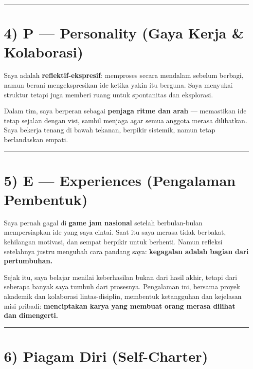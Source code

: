 \documentclass[
  letterpaper,
  DIV=11,
  numbers=noendperiod]{scrreprt}
\begin{document}
\begin{center}\rule{0.5\linewidth}{0.5pt}\end{center}

\section{4) P --- Personality (Gaya Kerja \&
Kolaborasi)}\label{p-personality-gaya-kerja-kolaborasi}

Saya adalah \textbf{reflektif-ekspresif}: memproses secara mendalam
sebelum berbagi, namun berani mengekspresikan ide ketika yakin itu
berguna. Saya menyukai struktur tetapi juga memberi ruang untuk
spontanitas dan eksplorasi.

Dalam tim, saya berperan sebagai \textbf{penjaga ritme dan arah} ---
memastikan ide tetap sejalan dengan visi, sambil menjaga agar semua
anggota merasa dilibatkan. Saya bekerja tenang di bawah tekanan,
berpikir sistemik, namun tetap berlandaskan empati.

\begin{center}\rule{0.5\linewidth}{0.5pt}\end{center}

\section{5) E --- Experiences (Pengalaman
Pembentuk)}\label{e-experiences-pengalaman-pembentuk}

Saya pernah gagal di \textbf{game jam nasional} setelah berbulan-bulan
mempersiapkan ide yang saya cintai. Saat itu saya merasa tidak berbakat,
kehilangan motivasi, dan sempat berpikir untuk berhenti. Namun refleksi
setelahnya justru mengubah cara pandang saya: \textbf{kegagalan adalah
bagian dari pertumbuhan.}

Sejak itu, saya belajar menilai keberhasilan bukan dari hasil akhir,
tetapi dari seberapa banyak saya tumbuh dari prosesnya. Pengalaman ini,
bersama proyek akademik dan kolaborasi lintas-disiplin, membentuk
ketangguhan dan kejelasan misi pribadi: \textbf{menciptakan karya yang
membuat orang merasa dilihat dan dimengerti.}

\begin{center}\rule{0.5\linewidth}{0.5pt}\end{center}

\section{6) Piagam Diri (Self-Charter)}\label{piagam-diri-self-charter}
\end{document}
